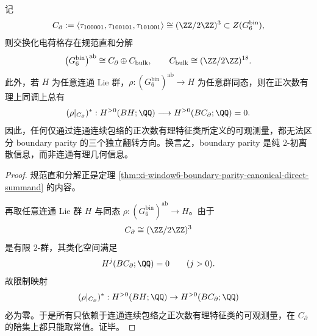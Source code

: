 \begin{theorem}\label{thm:conclusion-window6-boundary-parity-directsummand-rational-blindness}
记
\[
C_{\partial}
:=
\langle \tau_{100001},\tau_{100101},\tau_{101001}\rangle
\cong
(\ZZ/2\ZZ)^3
\subset Z(G_6^{\mathrm{bin}}),
\]
则交换化电荷格存在规范直和分解
\[
\bigl(G_6^{\mathrm{bin}}\bigr)^{\mathrm{ab}}
\cong
C_{\partial}\oplus C_{\mathrm{bulk}},
\qquad
C_{\mathrm{bulk}}\cong (\ZZ/2\ZZ)^{18}.
\]
此外，若 \(H\) 为任意连通 Lie 群，\(\rho:(G_6^{\mathrm{bin}})^{\mathrm{ab}}\to H\) 为任意群同态，则在正次数有理上同调上总有
\[
(\rho|_{C_{\partial}})^*:
H^{>0}(BH;\QQ)\longrightarrow H^{>0}(BC_{\partial};\QQ)=0.
\]
因此，任何仅通过连通连续包络的正次数有理特征类所定义的可观测量，都无法区分 boundary parity 的三个独立翻转方向。换言之，boundary parity 是纯 \(2\)-初离散信息，而非连通有理几何信息。
\end{theorem}
\begin{proof}
规范直和分解正是定理 \ref{thm:xi-window6-boundary-parity-canonical-direct-summand} 的内容。

再取任意连通 Lie 群 \(H\) 与同态 \(\rho:(G_6^{\mathrm{bin}})^{\mathrm{ab}}\to H\)。由于
\[
C_{\partial}\cong (\ZZ/2\ZZ)^3
\]
是有限 \(2\)-群，其类化空间满足
\[
H^{j}(BC_{\partial};\QQ)=0
\qquad (j>0).
\]
故限制映射
\[
(\rho|_{C_{\partial}})^*:H^{>0}(BH;\QQ)\to H^{>0}(BC_{\partial};\QQ)
\]
必为零。于是所有只依赖于连通连续包络之正次数有理特征类的可观测量，在 \(C_{\partial}\) 的陪集上都只能取常值。证毕。
\end{proof}

